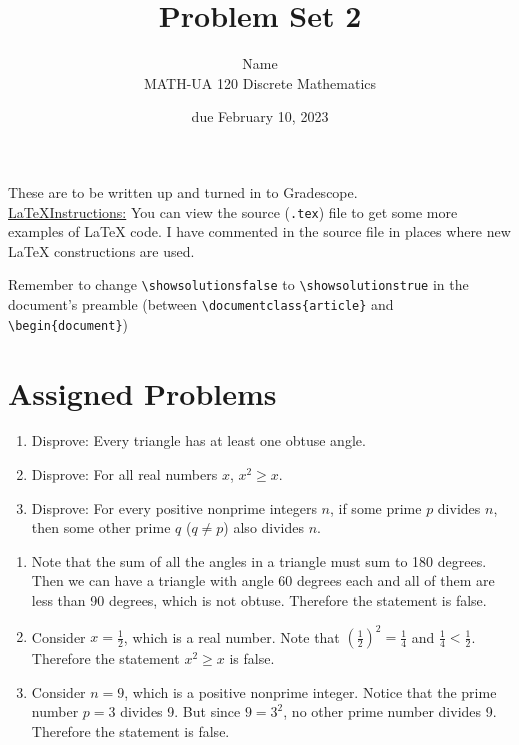 \documentclass{article}
\title{Problem Set 2}
\author{%
    Name
\\  MATH-UA 120 Discrete Mathematics
}
\date{due February 10, 2023}
\newif\ifshowsolutions
\newcommand{\danger}{\marginpar[\hfill\dbend]{\dbend\hfill}}
\theoremstyle{definition}
\begin{document}
\maketitle



These are to be written up and turned in to Gradescope.\\



\ifshowsolutions
    \SetupExSheets{solution/print=true}
\else
    \danger
 \underline{ \LaTeX  Instructions:}  You can view the source (\texttt{.tex}) file to get some more examples of \LaTeX{} code.  I have commented in the source file in places where new \LaTeX{} constructions are used.
  
  Remember to change \verb|\showsolutionsfalse| to \verb|\showsolutionstrue|
    in the document's preamble 
    (between \verb|\documentclass{article}| and \verb|\begin{document}|)
\fi

\section*{Assigned Problems}


\begin{question}
    \begin{enumerate}
        \item Disprove: Every triangle has at least one obtuse angle.
        \item Disprove: For all real numbers $x$, $x^2\geq x$.
        \item Disprove: For every positive nonprime integers $n$, if some prime $p$ divides $n$, 
            then some other prime $q$ ($q\neq p$) also divides $n$.
    \end{enumerate}
\end{question}
\begin{solution}
\begin{enumerate}
\item Note that the sum of all the angles in a triangle must sum to 180 degrees. Then we can have a triangle with angle 60 degrees each and all of them are less than 90 degrees, which is not obtuse. Therefore the statement is false.

\item Consider $x=\frac{1}{2}$, which is a real number. Note that $\left(\frac{1}{2}\right)^2=\frac{1}{4}$ and $\frac{1}{4}< \frac{1}{2}$. Therefore the statement $x^2\geq x$ is false.

\item Consider $n=9$, which is a positive nonprime integer. Notice that the prime number $p=3$ divides 9. But since $9=3^2$, no other prime number divides 9. Therefore the statement is false.
\end{enumerate}
\end{solution}
\end{document}
